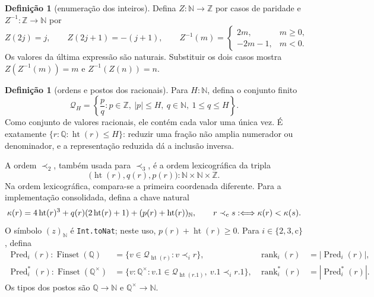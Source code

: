 \documentclass[12pt,a4paper]{article}
\theoremstyle{preciso}
\theoremstyle{definition}
\newtheorem{definicao}[teorema]{Definição}
\newcommand{\N}{\mathbb N}
\newcommand{\Z}{\mathbb Z}
\newcommand{\Q}{\mathbb Q}
\newcommand{\FS}{\operatorname{Finset}}
\newcommand{\htq}{\operatorname{ht}}
\newcommand{\pred}{\operatorname{Pred}}
\newcommand{\rankq}{\operatorname{rank}}
\newcommand{\qstar}{\Q^{\times}}
\newcommand{\code}[1]{\nolinkurl{#1}}
\theoremstyle{preciso}
\theoremstyle{preciso}
\theoremstyle{preciso}
\theoremstyle{preciso}
\theoremstyle{definition}
\theoremstyle{preciso}
\theoremstyle{definition}
\theoremstyle{preciso}
\theoremstyle{preciso}
\theoremstyle{definition}
\begin{document}
\begin{definicao}[enumeração dos inteiros]\label{map:normalizacao:4.3}
Defina $Z:\N\to\Z$ por casos de paridade e $Z^{-1}:\Z\to\N$ por
\[
 Z(2j)=j,\qquad Z(2j+1)=-(j+1),\qquad
 Z^{-1}(m)=\begin{cases}2m,&m\ge0,\\-2m-1,&m<0.\end{cases}
\]
Os valores da última expressão são naturais. Substituir os dois casos
mostra $Z(Z^{-1}(m))=m$ e $Z^{-1}(Z(n))=n$.
\end{definicao}

\begin{definicao}[ordens e postos dos racionais]\label{map:normalizacao:4.4}\label{normalizacao:def:rank}
Para $H:\N$, defina o conjunto finito
\[
 \mathcal Q_H=
 \left\{\frac{p}{q}:p\in\Z,\ |p|\le H,
                         \ q\in\N,\ 1\le q\le H\right\}.
\]
Como conjunto de valores racionais, ele contém cada valor uma única
vez. É exatamente $\{r:\Q:\htq(r)\le H\}$: reduzir uma fração não
amplia numerador ou denominador, e a representação reduzida dá a
inclusão inversa.

A ordem $\prec_2$, também usada para $\prec_3$, é a ordem
lexicográfica da tripla
\[
 \bigl(\htq(r),q(r),p(r)\bigr):\N\times\N\times\Z.
\]
Na ordem lexicográfica, compara-se a primeira coordenada diferente.
Para a implementação consolidada, defina a chave natural
\[
 \kappa(r)=4\htq(r)^3+q(r)(2\htq(r)+1)
                  +(p(r)+\htq(r))_{\N},
 \qquad r\prec_{\rm c}s:\Longleftrightarrow\kappa(r)<\kappa(s).
\]
O símbolo $(z)_{\N}$ é \code{Int.toNat}; neste uso,
$p(r)+\htq(r)\ge0$.
Para $i\in\{2,3,\mathrm c\}$, defina
\begin{align*}
 \pred_i(r):\FS(\Q)&=\{v\in\mathcal Q_{\htq(r)}:v\prec_i r\},
 &\rankq_i(r)&=|\pred_i(r)|,\\
 \pred_i^*(r):\FS(\qstar)&=\{v:\qstar:v.1\in\mathcal Q_{\htq(r.1)},\ v.1\prec_i r.1\},
 &\rankq_i^*(r)&=|\pred_i^*(r)|.
\end{align*}
Os tipos dos postos são $\Q\to\N$ e $\qstar\to\N$.
\end{definicao}
\end{document}

